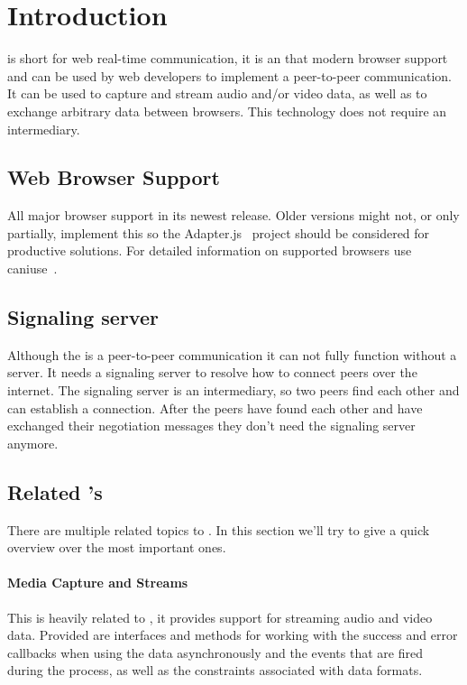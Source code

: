\clearpage
\chapter{Introduction}
 is short for web real-time communication, it is an  that modern browser support and can be used by web developers to implement a peer-to-peer communication. It can be used to capture and stream audio and/or video data, as well as to exchange arbitrary data between browsers. This technology does not require an intermediary.

\section{Web Browser Support}
All major browser support  in its newest release. Older versions might not, or only partially, implement this  so the Adapter.js~\autocite{adapterjs} project should be considered for productive solutions. For detailed information on supported browsers use caniuse~\autocite{caniuse}.

\section{Signaling server}
Although the  is a peer-to-peer communication  it can not fully function without a server. It needs a signaling server to resolve how to connect peers over the internet. The signaling server is an intermediary, so two peers find each other and can establish a connection. After the peers have found each other and have exchanged their negotiation messages they don't need the signaling server anymore.

\section{Related 's}
There are multiple related topics to . In this section we'll try to give a quick overview over the most important ones.

\subsubsection{Media Capture and Streams }
This  is heavily related to , it provides support for streaming audio and video data. Provided are interfaces and methods for working with the success and error callbacks when using the data asynchronously and the events that are fired during the process, as well as the constraints associated with data formats.